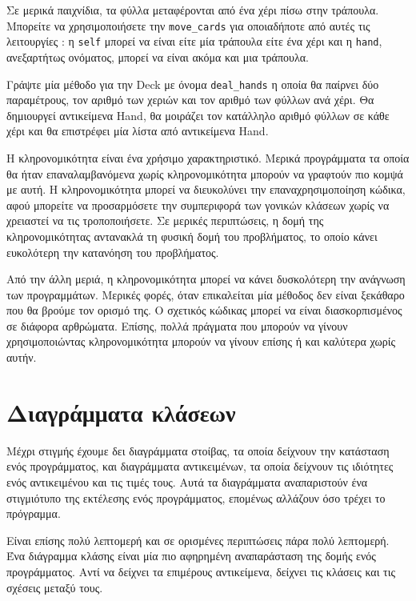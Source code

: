 \documentclass[10pt]{book}
\begin{document}
 Σε μερικά παιχνίδια, τα φύλλα μεταφέρονται από ένα χέρι πίσω στην τράπουλα.  
Μπορείτε να χρησιμοποιήσετε την  \verb"move_cards"  για οποιαδήποτε από αυτές 
τις λειτουργίες :  η  {\tt self}  μπορεί να είναι είτε μία τράπουλα είτε 
ένα χέρι και η  {\tt hand},  ανεξαρτήτως ονόματος, μπορεί να είναι ακόμα και μια  τράπουλα.

\begin{exercise}

Γράψτε μία μέθοδο για την  Deck  με όνομα  \verb"deal_hands"  η οποία 
θα παίρνει δύο παραμέτρους, τον αριθμό των χεριών και τον αριθμό των φύλλων ανά χέρι.
Θα δημιουργεί αντικείμενα  Hand,  θα μοιράζει τον κατάλληλο αριθμό  φύλλων σε 
κάθε χέρι και θα επιστρέφει μία λίστα από αντικείμενα  Hand.

\end{exercise}

 Η κληρονομικότητα είναι ένα χρήσιμο χαρακτηριστικό.  Μερικά προγράμματα τα οποία 
θα ήταν επαναλαμβανόμενα χωρίς κληρονομικότητα μπορούν να γραφτούν πιο κομψά με αυτή.  
Η κληρονομικότητα μπορεί να διευκολύνει την επαναχρησιμοποίηση κώδικα, αφού μπορείτε 
να προσαρμόσετε την συμπεριφορά των γονικών κλάσεων χωρίς να χρειαστεί να τις τροποποιήσετε.  Σε μερικές περιπτώσεις, η δομή της κληρονομικότητας αντανακλά τη φυσική 
δομή του προβλήματος, το οποίο κάνει ευκολότερη την κατανόηση του προβλήματος.

Από την άλλη μεριά, η κληρονομικότητα μπορεί να κάνει δυσκολότερη την ανάγνωση 
των προγραμμάτων.  Μερικές φορές, όταν επικαλείται μία μέθοδος δεν είναι ξεκάθαρο 
που θα βρούμε τον ορισμό της.  Ο σχετικός κώδικας μπορεί να είναι διασκορπισμένος 
σε διάφορα αρθρώματα.  Επίσης, πολλά πράγματα που μπορούν να γίνουν χρησιμοποιώντας 
κληρονομικότητα μπορούν να γίνουν επίσης ή και καλύτερα χωρίς αυτήν.



\section{Διαγράμματα κλάσεων}
\label{class.diagram}

Μέχρι στιγμής έχουμε δει διαγράμματα στοίβας, τα οποία δείχνουν την κατάσταση 
ενός προγράμματος, και διαγράμματα αντικειμένων, τα οποία δείχνουν τις ιδιότητες 
ενός αντικειμένου και τις τιμές τους.  Αυτά τα διαγράμματα αναπαριστούν ένα στιγμιότυπο 
της εκτέλεσης ενός προγράμματος, επομένως αλλάζουν όσο τρέχει το πρόγραμμα.

Είναι επίσης πολύ λεπτομερή και σε ορισμένες περιπτώσεις πάρα πολύ λεπτομερή.  
Ένα διάγραμμα κλάσης είναι μία πιο αφηρημένη αναπαράσταση της δομής ενός προγράμματος.  
Αντί να δείχνει τα επιμέρους αντικείμενα, δείχνει τις κλάσεις και τις σχέσεις μεταξύ τους.
\end{document}
